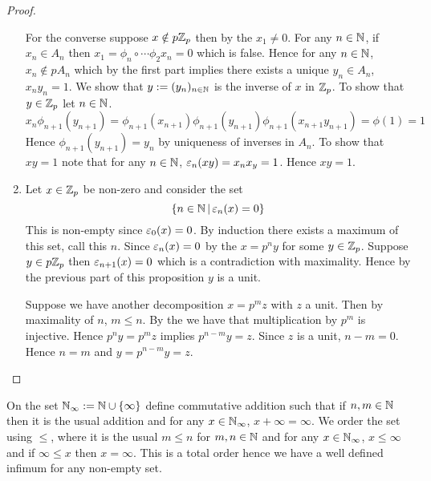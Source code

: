 \begin{proof}
\begin{enumerate}
            For the converse suppose $x \notin p \mathbb{Z}_p$
            then by the
            $x_1 \ne 0$.
            For any $n \in \mathbb{N}$, 
            if $x_n \in A_n$ then 
            $x_1 = \phi_n \circ \cdots \phi_2 x_n = 0$
            which is false.
            Hence for any $n \in \mathbb{N}$, $x_n \notin p A_n$
            which by the first part implies there exists
            a unique $y_n \in A_n$, $x_n y_n = 1$.
            We show that $y := (y_n)_{n \in \mathbb{N}}$ is the inverse of $x$
            in $\mathbb{Z}_p$.
            To show that $y \in \mathbb{Z}_p$ let $n \in \mathbb{N}$.
            \[x_n \phi_{n+1} (y_{n+1}) = 
            \phi_{n+1}(x_{n+1})\phi_{n+1}(y_{n+1})
            \phi_{n+1}(x_{n+1} y_{n+1}) = \phi(1) = 1\]
            Hence $\phi_{n+1} (y_{n+1}) = y_n$ 
            by uniqueness of inverses in $A_n$.
            To show that $x y = 1$ note that
            for any $n \in \mathbb{N}$, 
            $\varepsilon_n(xy) = x_n x_y = 1$.
            Hence $xy = 1$.
        \item Let $x \in \mathbb{Z}_p$ be non-zero and consider
            the set \[\left\{n \in \mathbb{N} \,|\, \varepsilon_n (x) = 0\right\}\]
            This is non-empty since $\varepsilon_0 (x) = 0$.
            By induction there exists a maximum of this set,
            call this $n$.
            Since $\varepsilon_n(x) = 0$ by the 
            $x = p^n y$ for some $y \in \mathbb{Z}_p$.
            Suppose $y \in p \mathbb{Z}_p$ then $\varepsilon_{n + 1} (x) = 0$
            which is a contradiction with maximality.
            Hence by the previous part of this proposition
            $y$ is a unit.
            
            Suppose we have another decomposition 
            $x = p^m z$ with $z$ a unit.
            Then by maximality of $n$, $m \le n$.
            By the 
            we have that multiplication by $p^m$ is injective.
            Hence $p^n y = p^m z$ implies $p^{n-m} y = z$.
            Since $z$ is a unit, $n - m = 0$.
            Hence $n = m$ and $y = p^{n-m} y = z$.
    \end{enumerate}
\end{proof}

\begin{dfn}[$\N_\infty$]
    On the set $\mathbb{N}_{\infty} := \mathbb{N} \cup \left\{\infty\right\}$ 
    define commutative addition such that
    if $n,m \in \mathbb{N}$ then it is the usual addition and
    for any $x \in \mathbb{N}_\infty$, $x + \infty = \infty$.
    We order the set using $\le$, 
    where it is the usual $m\le n$ for $m,n \in \mathbb{N}$
    and for any $x \in \mathbb{N}_\infty$, $x \le \infty$ and 
    if $\infty \le x$ then $x = \infty$.
    This is a total order hence we have a well defined
    infimum for any non-empty set.
\end{dfn}

